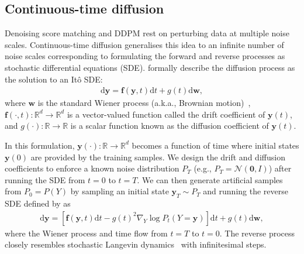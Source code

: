 \subsection{Continuous-time diffusion} \label{ch2C:Sec:continuous_diffusion}
Denoising score matching and DDPM rest on perturbing data at multiple noise scales. Continuous-time diffusion generalises this idea to an infinite number of noise scales corresponding to formulating the forward and reverse processes as stochastic differential equations (SDE). \citet{song2020score} formally describe the diffusion process as the solution to an It{\^o} SDE:
\begin{align}
  \text{d}\bm{y} = \bm{f}(\bm{y}, t) \text{d}t + g(t) \text{d}\bm{w}, \label{eq:continuous_diffusion}
\end{align}
where $\bm{w}$ is the standard Wiener process (a.k.a., Brownian motion)~\citep{wiener1957prediction, freedman2012brownian}, $\bm{f}(\cdot, t): \mathbb{R}^d \rightarrow \mathbb{R}^d$ is a vector-valued function called the drift coefficient of $\bm{y}(t)$, and $g(\cdot): \mathbb{R} \rightarrow \mathbb{R}$ is a scalar function known as
the diffusion coefficient of $\bm{y}(t)$.

In this formulation, $\bm{y}(\cdot): \mathbb{R} \rightarrow \mathbb{R}^d$ becomes a function of time where initial states $\bm{y}(0)$ are provided by the training samples. We design the drift and diffusion coefficients to enforce a known noise distribution $P_T$ (e.g., $P_T = \mathcal{N}(\bm 0, I)$) after running the SDE from $t=0$ to $t=T$. We can then generate artificial samples from $P_0 = P(Y)$ by sampling an initial state $\bm{y}_T \sim P_T$ and running the reverse SDE defined by \citet{anderson1982reverse} as
\begin{align}
  \text{d}\bm{y} = \left[ \bm{f}(\bm{y}, t) \text{d}t - g(t)^2 \nabla_Y \log P_t(Y=\bm{y}) \right] \text{d}t + g(t) \text{d}\bm{w},\label{eq:continuous_reverse_diffusion}
\end{align}
where the Wiener process and time flow from $t=T$ to $t=0$. The reverse process closely resembles stochastic Langevin dynamics~\citep{welling2011bayesian} with infinitesimal steps.

